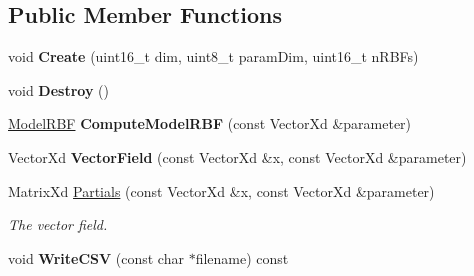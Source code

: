 \subsection*{Public Member Functions}
\begin{DoxyCompactItemize}
\item 
\hypertarget{struct_d_r_d_s_p_1_1_model_reduced_a630dfd8ee437ac00762db55a59fd8e05}{void {\bfseries Create} (uint16\-\_\-t dim, uint8\-\_\-t param\-Dim, uint16\-\_\-t n\-R\-B\-Fs)}\label{struct_d_r_d_s_p_1_1_model_reduced_a630dfd8ee437ac00762db55a59fd8e05}

\item 
\hypertarget{struct_d_r_d_s_p_1_1_model_reduced_a0cf3cf3e2dc9b7e9f905387bdd5ee941}{void {\bfseries Destroy} ()}\label{struct_d_r_d_s_p_1_1_model_reduced_a0cf3cf3e2dc9b7e9f905387bdd5ee941}

\item 
\hypertarget{struct_d_r_d_s_p_1_1_model_reduced_accd8ad44819268f2d49aeb426b4439c2}{\hyperlink{struct_d_r_d_s_p_1_1_model_r_b_f}{Model\-R\-B\-F} {\bfseries Compute\-Model\-R\-B\-F} (const Vector\-Xd \&parameter)}\label{struct_d_r_d_s_p_1_1_model_reduced_accd8ad44819268f2d49aeb426b4439c2}

\item 
\hypertarget{struct_d_r_d_s_p_1_1_model_reduced_a3e4dde2aa65d53f6033c0248bafab699}{Vector\-Xd {\bfseries Vector\-Field} (const Vector\-Xd \&x, const Vector\-Xd \&parameter)}\label{struct_d_r_d_s_p_1_1_model_reduced_a3e4dde2aa65d53f6033c0248bafab699}

\item 
\hypertarget{struct_d_r_d_s_p_1_1_model_reduced_a3ae282852370f25a33b346beb3ba2751}{Matrix\-Xd \hyperlink{struct_d_r_d_s_p_1_1_model_reduced_a3ae282852370f25a33b346beb3ba2751}{Partials} (const Vector\-Xd \&x, const Vector\-Xd \&parameter)}\label{struct_d_r_d_s_p_1_1_model_reduced_a3ae282852370f25a33b346beb3ba2751}

\begin{DoxyCompactList}\small\item\em The vector field. \end{DoxyCompactList}\item 
\hypertarget{struct_d_r_d_s_p_1_1_model_reduced_a3da2cd9ed93e71e44c00718e49ec4d2a}{void {\bfseries Write\-C\-S\-V} (const char $\ast$filename) const }\label{struct_d_r_d_s_p_1_1_model_reduced_a3da2cd9ed93e71e44c00718e49ec4d2a}

\end{DoxyCompactItemize}
